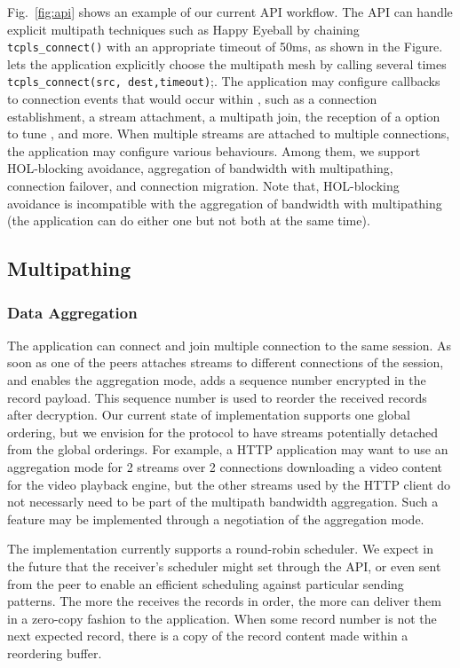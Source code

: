 Fig.~\ref{fig:api} shows an example of our current API workflow. The API can
handle explicit multipath techniques such as Happy Eyeball by chaining
\texttt{tcpls\_connect()} with an appropriate timeout of 50ms, as shown in the
Figure. \tcpls lets the application explicitly choose the multipath mesh by
calling several times \texttt{tcpls\_connect(src, dest,timeout)};. The
application may configure callbacks to connection events that would occur within
\tcpls, such as a connection establishment, a stream attachment, a multipath
join, the reception of a \tcp option to tune \tcp, and more. When multiple
streams are attached to multiple \tcp connections, the application may configure
various \tcpls behaviours. Among them, we support HOL-blocking avoidance,
aggregation of bandwidth with multipathing, connection failover, and connection
migration. Note that, HOL-blocking avoidance is incompatible with the
aggregation of bandwidth with multipathing (the application can do either one
but not both at the same time).




\subsection{Multipathing}

\subsubsection{Data Aggregation}
The application can connect and join multiple \tcp connection to
the same \tcpls session. As soon as one of the peers attaches streams to
different \tcp connections of the session, and enables the aggregation mode,
\tcpls adds a sequence number encrypted in the \tls record payload. This
sequence number is used to reorder the received records after decryption. Our
current state of implementation supports one global ordering, but
we envision for the \tcpls protocol to have streams potentially detached from
the global orderings. For example, a HTTP application may want to use an
aggregation mode for 2 streams over 2 \tcp connections downloading a video
content for the video playback engine, but the other streams used by the HTTP
client do not necessarly need to be part of the multipath bandwidth aggregation.
Such a feature may be implemented through a negotiation of the aggregation
mode.

The implementation currently supports a round-robin scheduler. We expect in the
future that the receiver's scheduler might set through the API, or even sent
from the peer to enable an efficient scheduling against particular sending patterns. The more
the \tcpls receives the records in order, the more \tcpls can deliver them in a zero-copy
fashion to the application. When some record number is not the next expected
record, there is a copy of the record content made within a reordering buffer.

